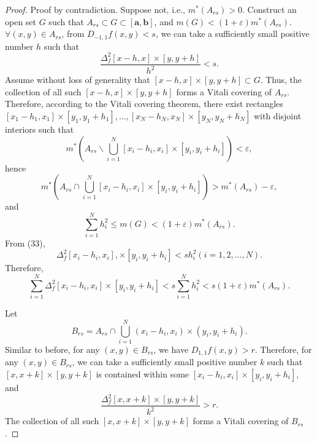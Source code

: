 \documentclass{ijclclp}
\begin{document}
\begin{proof}
    Proof by contradiction. Suppose not, i.e., \(m^{*}(A_{rs})>0\). Construct an open set \(G\) such that \(A_{rs}\subset G\subset[\boldsymbol{a},\boldsymbol{b}]\), and \(m(G)<(1+\varepsilon)m^{*}(A_{rs})\).
    \(\forall (x,y)\in A_{rs}\), from \(D_{-1,1}f(x,y)<s\), we can take a sufficiently small positive number \(h\) such that
    \begin{equation}
        \frac{\Delta_f^2[x-h,x]\times[y,y+h]}{h^2}<s.
    \end{equation}
    Assume without loss of generality that \([x-h,x]\times[y,y+h]\subset G\). Thus, the collection of all such \([x-h,x]\times[y,y+h]\) forms a Vitali covering of \(A_{rs}\). Therefore, according to the Vitali covering theorem, there exist rectangles 
    \([x_1-h_1,x_1]\times[y_1,y_1+h_1],\dots,[x_N-h_N,x_N]\times[y_N,y_N+h_N]\) with disjoint interiors such that
    \[m^{*}\left(A_{rs}\backslash\bigcup_{i=1}^{N}[x_i-h_i,x_i]\times[y_i,y_i+h_i]\right)<\varepsilon,\]
    hence
    \[m^{*}\left(A_{rs}\cap\bigcup_{i=1}^{N}[x_i-h_i,x_i]\times[y_i,y_i+h_i]\right)>m^{*}(A_{rs})-\varepsilon,\]
    and
    \[\sum_{i=1}^{N}h_i^2\leqslant m(G)<(1+\varepsilon)m^{*}(A_{rs}).\]
    From (33),
    \[\Delta_f^2[x_i-h_i,x_i],\times[y_i,y_i+h_i]<sh_i^2(i=1,2,\dots,N).\]
    Therefore,
    \begin{equation}
        \sum_{i=1}^{N}\Delta_f^2[x_i-h_i,x_i]\times[y_i,y_i+h_i]<s\sum_{i=1}^{N}h_i^2<s(1+\varepsilon)m^{*}(A_{rs}).
    \end{equation}
    
    Let
    \[B_{rs}=A_{rs}\cap\bigcup_{i=1}^{N}(x_i-h_i,x_i)\times(y_i,y_i+h_i).\]
    Similar to before, for any \((x,y)\in B_{rs}\), we have \(D_{1,1}f(x,y)>r\). 
    Therefore, for any \((x,y)\in B_{rs}\), we can take a sufficiently small positive number \(k\) such that \([x,x+k]\times[y,y+k]\) is contained within some \([x_i-h_i,x_i]\times[y_i,y_i+h_i]\), and
    \begin{equation}
        \frac{\Delta_f^2[x,x+k]\times[y,y+k]}{k^2}>r.
    \end{equation}
    The collection of all such \([x,x+k]\times[y,y+k]\) forms a Vitali covering of \(B_{rs}\).


\end{proof}
\end{document}
